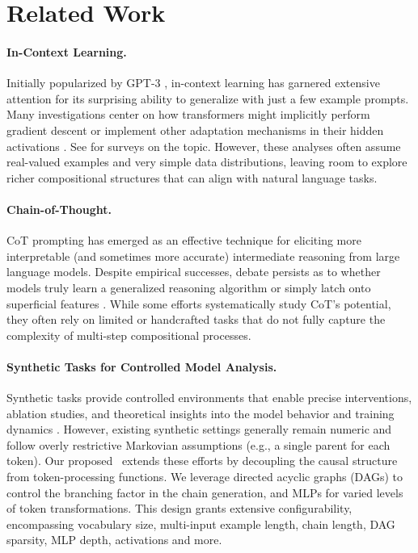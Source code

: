 \section{Related Work}
\paragraph{In-Context Learning.}
Initially popularized by GPT-3 \cite{brown2020language}, in-context learning has garnered extensive attention for its surprising ability to generalize with just a few example prompts. Many investigations center on how transformers might implicitly perform gradient descent or implement other adaptation mechanisms in their hidden activations \citep{garg2022can,akyurek2024incontext,von2023transformers, bai2023transformers}. See \cite{dong2022survey, zhou2024mystery} for surveys on the topic. However, these analyses often assume real-valued examples and very simple data distributions, leaving room to explore richer compositional structures that can align with natural language tasks.

\paragraph{Chain-of-Thought.}
CoT prompting \cite{wei2022chain,nye2021show,kojima2022large, chu2024navigate} has emerged as an effective technique for eliciting more interpretable (and sometimes more accurate) intermediate reasoning from large language models. Despite empirical successes, debate persists as to whether models truly learn a generalized reasoning algorithm or simply latch onto superficial features \cite{wang2022rationale}. While some efforts \cite{liu2024dag,prabhakar2024deciphering} systematically study CoT's potential, they often rely on limited or handcrafted tasks that do not fully capture the complexity of multi-step compositional processes.

\paragraph{Synthetic Tasks for Controlled Model Analysis.}
Synthetic tasks provide controlled environments that enable precise interventions, ablation studies, and theoretical insights into the model behavior and training dynamics \cite{garg2022can,von2023transformers, bai2023transformers}. However, existing synthetic settings generally remain numeric and follow overly restrictive Markovian assumptions \cite{edelman2024the} (e.g., a single parent for each token). Our proposed \coticl~extends these efforts by decoupling the causal structure from token-processing functions. We leverage directed acyclic graphs (DAGs) to control the branching factor in the chain generation, and MLPs for varied levels of token transformations. This design grants extensive configurability, encompassing vocabulary size, multi-input example length, chain length, DAG sparsity, MLP depth, activations and more.

